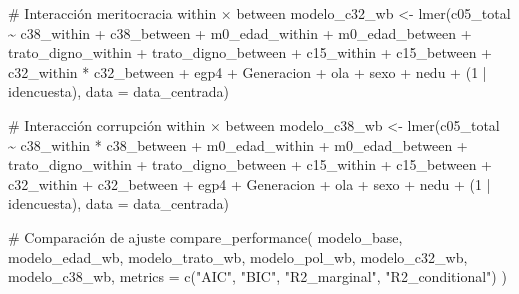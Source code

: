 \documentclass[
  spanish,
  a4paper,
  oneside]{scrbook}
\newenvironment{Shaded}{\begin{snugshade}}{\end{snugshade}}
\newcommand{\AttributeTok}[1]{\textcolor[rgb]{0.40,0.45,0.13}{#1}}
\newcommand{\CommentTok}[1]{\textcolor[rgb]{0.37,0.37,0.37}{#1}}
\newcommand{\DecValTok}[1]{\textcolor[rgb]{0.68,0.00,0.00}{#1}}
\newcommand{\FunctionTok}[1]{\textcolor[rgb]{0.28,0.35,0.67}{#1}}
\newcommand{\NormalTok}[1]{\textcolor[rgb]{0.00,0.23,0.31}{#1}}
\newcommand{\OtherTok}[1]{\textcolor[rgb]{0.00,0.23,0.31}{#1}}
\newcommand{\SpecialCharTok}[1]{\textcolor[rgb]{0.37,0.37,0.37}{#1}}
\newcommand{\StringTok}[1]{\textcolor[rgb]{0.13,0.47,0.30}{#1}}
\begin{document}
\begin{Shaded}
\begin{Highlighting}[]
\CommentTok{\# Interacción meritocracia within × between}
\NormalTok{modelo\_c32\_wb }\OtherTok{\textless{}{-}} \FunctionTok{lmer}\NormalTok{(c05\_total }\SpecialCharTok{\textasciitilde{}} 
\NormalTok{                        c38\_within }\SpecialCharTok{+}\NormalTok{ c38\_between }\SpecialCharTok{+}
\NormalTok{                        m0\_edad\_within }\SpecialCharTok{+}\NormalTok{ m0\_edad\_between }\SpecialCharTok{+}
\NormalTok{                        trato\_digno\_within }\SpecialCharTok{+}\NormalTok{ trato\_digno\_between }\SpecialCharTok{+}
\NormalTok{                        c15\_within }\SpecialCharTok{+}\NormalTok{ c15\_between }\SpecialCharTok{+}
\NormalTok{                        c32\_within }\SpecialCharTok{*}\NormalTok{ c32\_between }\SpecialCharTok{+}
\NormalTok{                        egp4 }\SpecialCharTok{+}\NormalTok{ Generacion }\SpecialCharTok{+}\NormalTok{ ola }\SpecialCharTok{+}\NormalTok{ sexo }\SpecialCharTok{+}\NormalTok{ nedu }\SpecialCharTok{+}
\NormalTok{                        (}\DecValTok{1} \SpecialCharTok{|}\NormalTok{ idencuesta), }\AttributeTok{data =}\NormalTok{ data\_centrada)}

\CommentTok{\# Interacción corrupción within × between}
\NormalTok{modelo\_c38\_wb }\OtherTok{\textless{}{-}} \FunctionTok{lmer}\NormalTok{(c05\_total }\SpecialCharTok{\textasciitilde{}} 
\NormalTok{                        c38\_within }\SpecialCharTok{*}\NormalTok{ c38\_between }\SpecialCharTok{+}
\NormalTok{                        m0\_edad\_within }\SpecialCharTok{+}\NormalTok{ m0\_edad\_between }\SpecialCharTok{+}
\NormalTok{                        trato\_digno\_within }\SpecialCharTok{+}\NormalTok{ trato\_digno\_between }\SpecialCharTok{+}
\NormalTok{                        c15\_within }\SpecialCharTok{+}\NormalTok{ c15\_between }\SpecialCharTok{+}
\NormalTok{                        c32\_within }\SpecialCharTok{+}\NormalTok{ c32\_between }\SpecialCharTok{+}
\NormalTok{                        egp4 }\SpecialCharTok{+}\NormalTok{ Generacion }\SpecialCharTok{+}\NormalTok{ ola }\SpecialCharTok{+}\NormalTok{ sexo }\SpecialCharTok{+}\NormalTok{ nedu }\SpecialCharTok{+}
\NormalTok{                        (}\DecValTok{1} \SpecialCharTok{|}\NormalTok{ idencuesta), }\AttributeTok{data =}\NormalTok{ data\_centrada)}

\CommentTok{\# Comparación de ajuste}
\FunctionTok{compare\_performance}\NormalTok{(}
\NormalTok{  modelo\_base, modelo\_edad\_wb, modelo\_trato\_wb,}
\NormalTok{  modelo\_pol\_wb, modelo\_c32\_wb, modelo\_c38\_wb,}
  \AttributeTok{metrics =} \FunctionTok{c}\NormalTok{(}\StringTok{"AIC"}\NormalTok{, }\StringTok{"BIC"}\NormalTok{, }\StringTok{"R2\_marginal"}\NormalTok{, }\StringTok{"R2\_conditional"}\NormalTok{)}
\NormalTok{)}
\end{Highlighting}
\end{Shaded}
\end{document}
